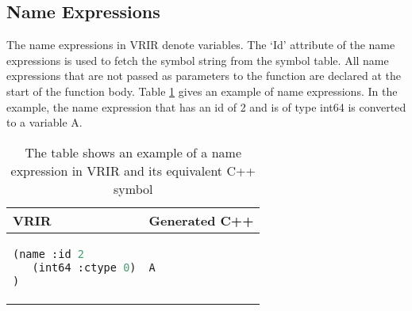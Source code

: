 \subsection{Name Expressions}
The name expressions in VRIR denote variables. The `Id' attribute of the name expressions is used to fetch the symbol string from the symbol table. All name expressions that are not passed as parameters to the function are declared at the start of the function body. Table \ref{tab:nameExpr} gives an example of name expressions. In the example, the name expression that has an id of 2 and is of type int64 is converted to a variable A.
\begin{table}[htbp]
\centering
\begin{tabular}{|l|l|}
\hline

VRIR &  Generated C++ \\
\hline
{
\begin{lstlisting}[language=lisp,frame=none, numbers=none]
(name :id 2
   (int64 :ctype 0)
)
\end{lstlisting}
}
&
{
\begin{lstlisting}[language=c,frame=none, numbers=none]
A
\end{lstlisting}
} \\
\hline
\end{tabular}
\caption[Name Expressions example]{The table shows an example of a name expression in VRIR and its equivalent C++ symbol}
\label{tab:nameExpr}
\end{table}
